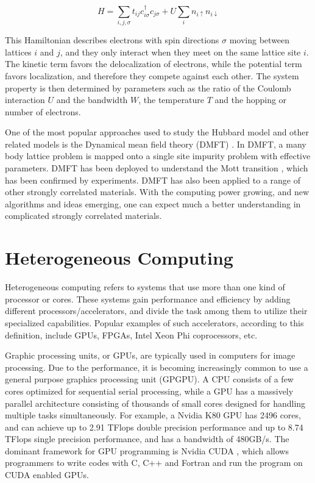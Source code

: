 \begin{equation}
  \label{eq:13}
  H=\sum_{i,j,\sigma}t_{ij}c_{i\sigma}^\dagger c_{j\sigma} + U\sum_i n_{i\uparrow} n_{i\downarrow}
\end{equation}

This Hamiltonian describes electrons with spin directions $\sigma$ moving between 
lattices $i$ and $j$, and they only interact when they meet on the same lattice 
site $i$. The kinetic term favors the delocalization of electrons, while the 
potential term favors localization, and therefore they compete against each
other. The system property is then determined by parameters such as the ratio of
the Coulomb interaction $U$ and the bandwidth $W$, the temperature $T$ and the 
hopping or number of electrons. 

One of the most popular approaches used to study the Hubbard model and other related
models is the Dynamical mean field theory (DMFT)
\cite{PhysRevB.45.6479,PhysRevLett.69.168,RevModPhys.68.13,PhysRevLett.69.1236,PhysRevLett.69.1240}. 
In DMFT, a many body lattice
problem is mapped onto a single site impurity problem with effective parameters.
DMFT has been deployed to understand the Mott transition 
\cite{PhysRevLett.69.1796,PhysRevLett.70.1666,PhysRevB.48.7167},
which has been confirmed
by experiments\cite{PhysRevLett.75.105,PhysRevB.58.3690,PhysRevLett.90.186403}. 
DMFT has also been applied to a range of other strongly correlated 
materials. With the computing power growing, and new algorithms and ideas emerging, 
one can expect much a better understanding in complicated strongly correlated 
materials.

\section{Heterogeneous Computing}
Heterogeneous computing refers to systems that use more than one kind of 
processor or cores. These systems gain performance and efficiency by adding
different processors/accelerators, and divide the task among them to utilize 
their specialized capabilities. 
Popular examples of such accelerators, according to this definition, include 
GPUs, FPGAs, Intel Xeon Phi coprocessors, etc.


Graphic processing units, or GPUs, are typically used in computers for image 
processing. 
Due to the performance, it is becoming increasingly common to use a general purpose 
graphics processing unit (GPGPU).
A CPU consists of a few cores optimized for sequential serial processing,
while a GPU has a massively parallel architecture 
consisting of thousands of small cores designed for handling multiple tasks 
simultaneously.
For example, a Nvidia K80 GPU \cite{nv_k80_spec} has 2496 cores, and can achieve up to 2.91 TFlops 
double precision performance and up to 8.74 TFlops single precision performance, 
and has a bandwidth of 480GB/s.
The dominant framework for GPU programming is Nvidia CUDA \cite{Nickolls:2008:SPP:1365490.1365500}, which allows 
programmers to write codes with C, C++ and Fortran and run the program on CUDA
enabled GPUs.


